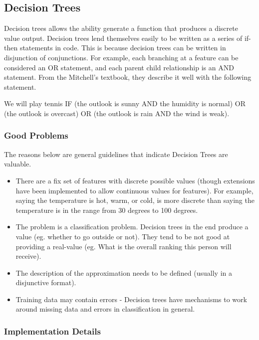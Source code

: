 \documentclass[11pt]{article}
\begin{document}
\subsection{Decision Trees}

Decision trees allows the ability generate a function that produces a discrete value output. Decision trees lend themselves easily to be written as a series of if-then statements in code. This is because decision trees can be written in disjunction of conjunctions. For example, each branching at a feature can be considered an OR statement, and each parent child relationship is an AND statement. From the Mitchell's textbook, they describe it well with the following statement.

We will play tennis IF (the outlook is sunny AND the humidity is normal) OR (the outlook is overcast) OR (the outlook is rain AND the wind is weak).

\subsubsection{Good Problems}

The reasons below are general guidelines that indicate Decision Trees are valuable. 

\begin{itemize}
\item There are a fix set of features with discrete possible values (though extensions have been implemented to allow continuous values for features). For example, saying the temperature is hot, warm, or cold, is more discrete than saying the temperature is in the range from 30 degrees to 100 degrees.
\item The problem is a classification problem. Decision trees in the end produce a value (eg. whether to go outside or not). They tend to be not good at providing a real-value (eg. What is the overall ranking this person will receive).
\item The description of the approximation needs to be defined (usually in a disjunctive format).
\item Training data may contain errors - Decision trees have mechanisms to work around missing data and errors in classification in general.
\end{itemize}

\subsubsection{Implementation Details}
\end{document}
